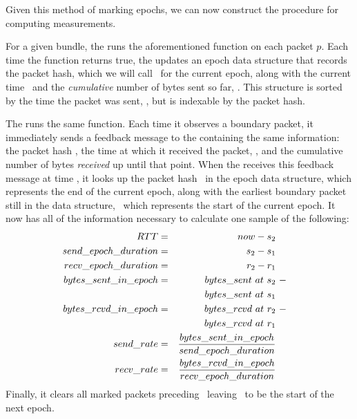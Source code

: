 Given this method of marking epochs, we can now construct the procedure for computing measurements.

For a given bundle, the \inbox runs the aforementioned function on each packet $p$. Each time
the function returns true, the \inbox updates an epoch data structure that records the packet hash,
which we will call \hptwo\ for the current epoch, 
along with the current time \stwo\ and the \emph{cumulative} number of bytes sent so far, \senttwo. This structure
is sorted by the time the packet was sent, \stwo, but is indexable by the packet hash.

The \outbox runs the same function. Each time it observes a boundary packet, 
it immediately sends a feedback message to the \inbox containing the same information:
the packet hash \hptwo, the time at which it received the packet, \rtwo, and the cumulative number of bytes
\emph{received} up until that point. When the \inbox receives this feedback message at time \atwo, it looks up the
packet hash \hptwo\ in the epoch data structure, which represents the end of the current epoch,
along with the earliest boundary packet still in the data structure, \hpone\ which represents the start
of the current epoch. It now has all of the information necessary to calculate one sample of the following:
\begin{subequations}
    \begin{align}
        RTT &= &now - s_2 \\
        send\_epoch\_duration &= &s_2 - s_1\\
        recv\_epoch\_duration &= &r_2 - r_1\\
        bytes\_sent\_in\_epoch &= &bytes\_sent\ at\ s_2 &\ - \\
                                    &&bytes\_sent\ at\ s_1&\notag\\
        bytes\_rcvd\_in\_epoch &= &bytes\_rcvd\ at\ r_2 &\ - \\
                                &&bytes\_rcvd\ at\ r_1\notag\\
        send\_rate &= &\frac{bytes\_sent\_in\_epoch}{send\_epoch\_duration}\\
        recv\_rate &= &\frac{bytes\_rcvd\_in\_epoch}{recv\_epoch\_duration}
    \end{align}
\end{subequations}
Finally, it clears all marked packets preceding \ptwo\ leaving \ptwo\
to be the start of the next epoch.

